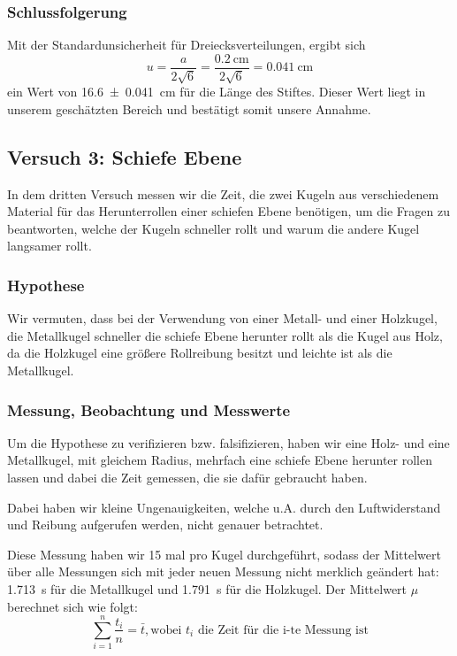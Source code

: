 \documentclass[11pt,a4paper,titlepage, ngerman]{article}
\begin{document}
			\subsubsection{Schlussfolgerung}
				
				Mit der Standardunsicherheit für Dreiecksverteilungen, ergibt sich 
				\begin{equation*}
					u = \frac{a}{2 \sqrt{6}} = \frac{\SI{0,2}{\cm}}{2 \sqrt{6}} = \SI{0,041}{\cm}
				\end{equation*}
				ein Wert von \SI{16,6 \pm 0,041}{\cm} für die Länge des Stiftes. Dieser Wert liegt in unserem geschätzten Bereich und bestätigt somit unsere Annahme.
		\subsection{Versuch 3: Schiefe Ebene}
			\label{2.3}	
			
			In dem dritten Versuch messen wir die Zeit, die zwei Kugeln aus verschiedenem Material für das Herunterrollen einer schiefen Ebene benötigen, um die Fragen zu beantworten, welche der Kugeln schneller rollt und warum die andere Kugel langsamer rollt.		
				
			\subsubsection{Hypothese}
				\label{2.3.1}
					
				Wir vermuten, dass bei der Verwendung von einer Metall- und einer Holzkugel, die Metallkugel schneller die schiefe Ebene herunter rollt als die Kugel aus Holz, da die Holzkugel eine größere Rollreibung besitzt und leichte ist als die Metallkugel. 
				
			\subsubsection{Messung, Beobachtung und Messwerte}
				\label{2.3.2}
				
				Um die Hypothese zu verifizieren bzw. falsifizieren, haben wir eine Holz- und eine Metallkugel, mit gleichem Radius, mehrfach eine schiefe Ebene herunter rollen lassen und dabei die Zeit gemessen, die sie dafür gebraucht haben.
				
				Dabei haben wir kleine Ungenauigkeiten, welche u.A. durch den Luftwiderstand und Reibung aufgerufen werden, nicht genauer betrachtet. 
				
				Diese Messung haben wir 15 mal pro Kugel durchgeführt, sodass der Mittelwert über alle Messungen sich mit jeder neuen Messung nicht merklich geändert hat: \SI{1.713}{\s} für die Metallkugel und \SI{1.791}{\s} für die Holzkugel. Der Mittelwert $\mu$ berechnet sich wie folgt:
				\begin{equation*}
					 \sum\limits_{i=1}^n \frac{t_i}{n} = \bar{t}, \text{wobei $t_i$ die Zeit für die i-te Messung ist}
				\end{equation*}		
				
\end{document}
